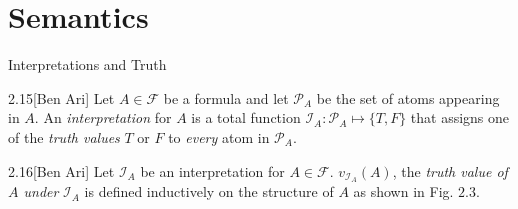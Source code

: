 \documentclass[style=sailor,size=12pt]{powerdot}
\begin{document}
\section[slide=true]{Semantics}
\begin{slide}[bm=,toc=]{Interpretations and Truth}
\begin{defn}{2.15}[Ben Ari]
Let $A \in \mathcal{F}$ be a formula and let $\mathcal{P}_A$ be the
  set of atoms appearing in $A$. An \emph{interpretation} for $A$ is a 
total function $\mathcal{I}_A: \mathcal{P}_A \mapsto \{T,F\}$ that assigns
one of the \emph{truth values} $T$ or $F$ to \emph{every} atom in
$\mathcal{P}_A$.
\end{defn}
\begin{defn}{2.16}[Ben Ari]
Let $\mathcal{I}_A$ be an interpretation for $A \in \mathcal{F}$.
$v_{\mathcal{I}_A}(A)$, the \emph{truth value of $A$ under} $\mathcal{I}_A$
is defined inductively on the structure of $A$ as shown in Fig. $2.3$.
\end{defn}
\end{slide}
\end{document}
